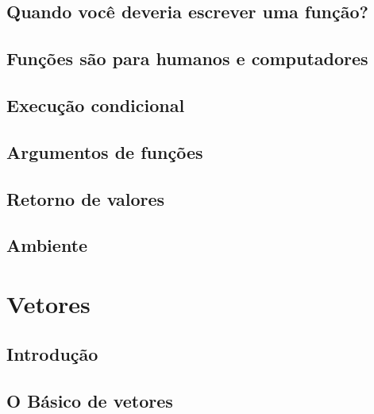 \documentclass[
]{latex/krantz}
\theoremstyle{definition}
\theoremstyle{definition}
\theoremstyle{definition}
\theoremstyle{definition}
\theoremstyle{remark}
\begin{document}
\hypertarget{quando-vocuxea-deveria-escrever-uma-funuxe7uxe3o}{%
\section{Quando você deveria escrever uma função?}\label{quando-vocuxea-deveria-escrever-uma-funuxe7uxe3o}}

\hypertarget{funuxe7uxf5es-suxe3o-para-humanos-e-computadores}{%
\section{Funções são para humanos e computadores}\label{funuxe7uxf5es-suxe3o-para-humanos-e-computadores}}

\hypertarget{execuuxe7uxe3o-condicional}{%
\section{Execução condicional}\label{execuuxe7uxe3o-condicional}}

\hypertarget{argumentos-de-funuxe7uxf5es}{%
\section{Argumentos de funções}\label{argumentos-de-funuxe7uxf5es}}

\hypertarget{retorno-de-valores}{%
\section{Retorno de valores}\label{retorno-de-valores}}

\hypertarget{ambiente}{%
\section{Ambiente}\label{ambiente}}

\hypertarget{vetores}{%
\chapter{Vetores}\label{vetores}}

\hypertarget{introduuxe7uxe3o-12}{%
\section{Introdução}\label{introduuxe7uxe3o-12}}

\hypertarget{o-buxe1sico-de-vetores}{%
\section{O Básico de vetores}\label{o-buxe1sico-de-vetores}}
\end{document}

